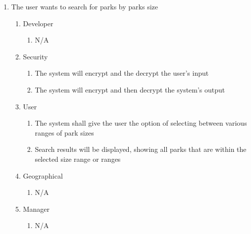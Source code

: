 \documentclass[titlepage]{article}
\begin{document}
\begin{enumerate}[{BE}1.]
    \item The user wants to search for parks by parks size
    \begin{enumerate}[{VP\theenumi}.1]
        \item Developer
            \begin{enumerate}
                \item N/A
            \end{enumerate}
        \item Security
            \begin{enumerate}
                \item The system will encrypt and the decrypt the user's input
                \item The system will encrypt and then decrypt the system's output
            \end{enumerate}
        \item User
            \begin{enumerate}
                \item The system shall give the user the option of selecting between various ranges
                of park sizes
                \item Search results will be displayed, showing all parks that are within the
                selected size range or ranges
            \end{enumerate}
        \item Geographical
            \begin{enumerate}
                \item N/A
            \end{enumerate}
        \item Manager
            \begin{enumerate}
                \item N/A
            \end{enumerate}
    \end{enumerate}


\end{enumerate}
\end{document}
